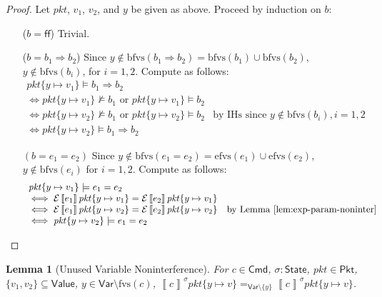 \documentclass{article}
\newcommand{\pkt}{\mathit{pkt}}
\newcommand{\denote}[1]{\left\llbracket#1\right\rrbracket}
\newcommand{\edenote}[1]{\mathcal{E}\denote{#1}}
\newcommand{\FALSE}{\mathsf{ff}}
\newcommand{\Value}{\mathsf{Value}}
\newcommand{\Cmd}{\mathsf{Cmd}}
\newcommand{\Pkt}{\mathsf{Pkt}}
\newcommand{\Var}{\mathsf{Var}}
\newcommand{\State}{\mathsf{State}}
\newcommand{\fvs}{\textrm{fvs}}
\newcommand{\efvs}{\textrm{efvs}}
\newcommand{\bfvs}{\textrm{bfvs}}
\theoremstyle{plain}
\newtheorem{lemma}{Lemma}
\theoremstyle{definition}
\theoremstyle{remark}
\begin{document}
\begin{proof}
  Let $\pkt$, $v_1$, $v_2$, and $y$ be given as above.
  Proceed by induction on $b$:
  \begin{enumerate}[align=left]
  \item[($b = \FALSE$)] Trivial.
  \item[($b = b_1 \Rightarrow b_2$)] Since $y \not \in\bfvs(b_1 \Rightarrow b_2) =
    \bfvs(b_1) \cup \bfvs(b_2)$, $y \not \in \bfvs(b_i)$, for $i = 1,2$. Compute
    as follows:
    \[\begin{array}{ll}
    \pkt\{y \mapsto v_1\} \models b_1 \Rightarrow b_2 \\
    \iff \pkt\{y \mapsto v_1\} \not\models b_1 \text{ or } \pkt\{y \mapsto v_1\} \models b_2 \\
    \iff \pkt\{y \mapsto v_2\} \not\models b_1 \text{ or } \pkt\{y \mapsto v_2\} \models b_2
    & \text{by IHs since } y \not \in \bfvs(b_i), i = 1,2 \\
    \iff \pkt\{y \mapsto v_2\} \models b_1 \Rightarrow b_2
    \end{array}\]

  \item[$(b = e_1 = e_2)$] Since $y \not \in\bfvs(e_1 = e_2) = \efvs(e_1) \cup
    \efvs(e_2)$, $y \not \in \bfvs(e_i)$ for $i =1,2$. Compute as follows:
    \[\begin{array}{ll}
    \pkt\{y \mapsto v_1\} \models e_1 = e_2 \\
    \iff \edenote{e_1}\pkt\{y \mapsto v_1\} = \edenote{e_2}\pkt\{y \mapsto v_1\} \\
    \iff\edenote{e_1}\pkt\{y \mapsto v_2\} = \edenote{e_2}\pkt\{y \mapsto v_2\} & \text{by Lemma~\ref{lem:exp-param-noninter}} \\
    \iff \pkt\{y\mapsto v_2\} \models e_1 = e_2
    \end{array}
    \]
  \end{enumerate}
\end{proof}

\begin{lemma}[Unused Variable Noninterference]
  \label{lem:param-noninter}
  For $c \in \Cmd$, $\sigma : \State$, $\pkt \in \Pkt$,
  $\{v_1,v_2\} \subseteq \Value$, $y \in \Var \setminus \fvs(c)$,
  $\denote{c}^\sigma \pkt\{y \mapsto v\} =_{\Var \setminus \{y\}}\denote{c}^\sigma\pkt\{y \mapsto v\}$.
\end{lemma}
\end{document}
